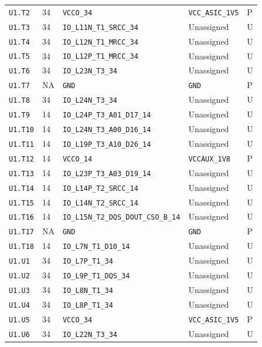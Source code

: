 \documentclass[11pt,a4paper]{article}
\begin{document}
\begin{longtable}{@{}P{20mm}P{10mm}P{75mm}P{49mm}P{7mm}@{}}
\nolinkurl{U1.T2} & 34 & \nolinkurl{VCCO_34} & \nolinkurl{VCC_ASIC_1V5} & P \\
\nolinkurl{U1.T3} & 34 & \nolinkurl{IO_L11N_T1_SRCC_34} & Unassigned & U \\
\nolinkurl{U1.T4} & 34 & \nolinkurl{IO_L12N_T1_MRCC_34} & Unassigned & U \\
\nolinkurl{U1.T5} & 34 & \nolinkurl{IO_L12P_T1_MRCC_34} & Unassigned & U \\
\nolinkurl{U1.T6} & 34 & \nolinkurl{IO_L23N_T3_34} & Unassigned & U \\
\nolinkurl{U1.T7} & NA & \nolinkurl{GND} & \nolinkurl{GND} & P \\
\nolinkurl{U1.T8} & 34 & \nolinkurl{IO_L24N_T3_34} & Unassigned & U \\
\nolinkurl{U1.T9} & 14 & \nolinkurl{IO_L24P_T3_A01_D17_14} & Unassigned & U \\
\nolinkurl{U1.T10} & 14 & \nolinkurl{IO_L24N_T3_A00_D16_14} & Unassigned & U \\
\nolinkurl{U1.T11} & 14 & \nolinkurl{IO_L19P_T3_A10_D26_14} & Unassigned & U \\
\nolinkurl{U1.T12} & 14 & \nolinkurl{VCCO_14} & \nolinkurl{VCCAUX_1V8} & P \\
\nolinkurl{U1.T13} & 14 & \nolinkurl{IO_L23P_T3_A03_D19_14} & Unassigned & U \\
\nolinkurl{U1.T14} & 14 & \nolinkurl{IO_L14P_T2_SRCC_14} & Unassigned & U \\
\nolinkurl{U1.T15} & 14 & \nolinkurl{IO_L14N_T2_SRCC_14} & Unassigned & U \\
\nolinkurl{U1.T16} & 14 & \nolinkurl{IO_L15N_T2_DQS_DOUT_CSO_B_14} & Unassigned & U \\
\nolinkurl{U1.T17} & NA & \nolinkurl{GND} & \nolinkurl{GND} & P \\
\nolinkurl{U1.T18} & 14 & \nolinkurl{IO_L7N_T1_D10_14} & Unassigned & U \\
\nolinkurl{U1.U1} & 34 & \nolinkurl{IO_L7P_T1_34} & Unassigned & U \\
\nolinkurl{U1.U2} & 34 & \nolinkurl{IO_L9P_T1_DQS_34} & Unassigned & U \\
\nolinkurl{U1.U3} & 34 & \nolinkurl{IO_L8N_T1_34} & Unassigned & U \\
\nolinkurl{U1.U4} & 34 & \nolinkurl{IO_L8P_T1_34} & Unassigned & U \\
\nolinkurl{U1.U5} & 34 & \nolinkurl{VCCO_34} & \nolinkurl{VCC_ASIC_1V5} & P \\
\nolinkurl{U1.U6} & 34 & \nolinkurl{IO_L22N_T3_34} & Unassigned & U \\

\end{longtable}
\end{document}
